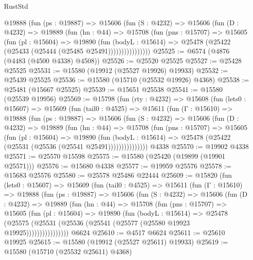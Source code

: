 \begin{lexlean}{RustStd}
\begin{coremodule}
            @19888
              (fun (ps : @19887) =>
              @15606
                (fun (S : @4232) =>
                @15606
                  (fun (D : @4232) =>
                  @19889
                    (fun (hn : @44) =>
                    @15708
                      (fun (pns : @15707) =>
                      @15605
                        (fun (pl : @15604) =>
                        @19890
                          (fun (bodyL : @15614) =>
                          @25478 (@25422 (@25433 (@25444 (@25485 @25491))))))))))))))))
@25525 := @6574 (@4876 (@4483 (@4500 @4338) @4508))
@25526 := @25520 @25525
@25527 := @25428 @25525
@25531 := @15580 (@19912 (@25527 @19926) @19933)
@25532 := @25439 @25525
@25536 := @15580 (@15710 (@25532 @19926) @4368)
@25538 := @25481 (@15667 @25525)
@25539 := @15651 @25538
@25541 := @15580 (@25539 @19956)
@25569 := @15798
    (fun (rty : @4232) =>
    @15608
      (fun (lets0 : @15607) =>
      @15609
        (fun (tail0 : @4525) =>
        @15611
          (fun (Γ : @15610) =>
          @19888
            (fun (ps : @19887) =>
            @15606
              (fun (S : @4232) =>
              @15606
                (fun (D : @4232) =>
                @19889
                  (fun (hn : @44) =>
                  @15708
                    (fun (pns : @15707) =>
                    @15605
                      (fun (pl : @15604) =>
                      @19890
                        (fun (bodyL : @15614) =>
                        @25478 (@25422 (@25531 (@25536 (@25541 @25491)))))))))))))))
    @4338
@25570 := @19902 @4338
@25571 := @25570 @15598
@25575 := @15580 (@25420 (@19899 (@19901 @25571)))
@25576 := @15680 @4338
@25577 := @19959 @25576
@25578 := @15683 @25576
@25580 := @25578 @25486 @22444
@25609 := @15820
    (fun (lets0 : @15607) =>
    @15609
      (fun (tail0 : @4525) =>
      @15611
        (fun (Γ : @15610) =>
        @19888
          (fun (ps : @19887) =>
          @15606
            (fun (S : @4232) =>
            @15606
              (fun (D : @4232) =>
              @19889
                (fun (hn : @44) =>
                @15708
                  (fun (pns : @15707) =>
                  @15605
                    (fun (pl : @15604) =>
                    @19890
                      (fun (bodyL : @15614) =>
                      @25478
                        (@25575
                          (@25531 (@25536 (@25541 (@25577 (@25580 @19923 @19925))))))))))))))))
    @6624
@25610 := @4517 @6624
@25611 := @25610 @19925
@25615 := @15580 (@19912 (@25527 @25611) @19933)
@25619 := @15580 (@15710 (@25532 @25611) @4368)

\end{coremodule}
\end{lexlean}
